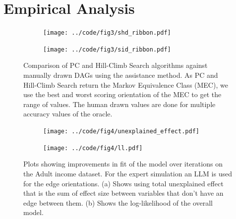 \documentclass{uai2025} %
\begin{document}

\section{Empirical Analysis}
\label{sec:empirical}

\begin{figure}[t!]
	\centering
	\begin{subfigure}{0.5\textwidth}
		\centering
		\texttt{[image: ../code/fig3/shd\_ribbon.pdf]}
		\caption{}
	\end{subfigure}
	\begin{subfigure}{0.5\textwidth}
		\centering
		\texttt{[image: ../code/fig3/sid\_ribbon.pdf]}
		\caption{}
	\end{subfigure}
	\caption{Comparison of PC and Hill-Climb Search algorithms against
		manually drawn DAGs using the assistance method. As PC and
		Hill-Climb Search return the Markov Equivalence Class (MEC), we
		use the best and worst scoring orientation of the MEC to get
		the range of values. The human drawn values are done for
		multiple accuracy values of the oracle.}
\end{figure}

\begin{figure}[t!]
	\begin{subfigure}{0.25\textwidth}
		\centering
		\texttt{[image: ../code/fig4/unexplained\_effect.pdf]}
		\caption{}
	\end{subfigure}%
	\begin{subfigure}{0.25\textwidth}
		\centering
		\texttt{[image: ../code/fig4/ll.pdf]}
		\caption{}
	\end{subfigure}
	\caption{Plots showing improvements in fit of the model over iterations
	on the Adult income dataset. For the expert simulation an LLM is used
	for the edge orientations. (a) Shows using total unexplained effect that is the
	sum of effect size between variables that don't have an edge between them. (b)
	Shows the log-likelihood of the overall model.
	}
\end{figure}
\end{document}
